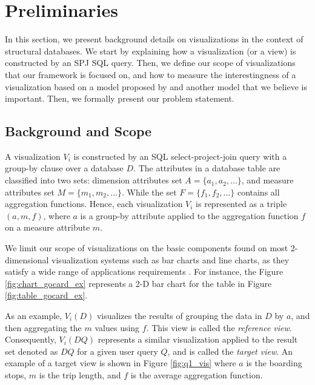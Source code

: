 \section{Preliminaries}
\label{sec:prelim}
%
%
In this section, we present background details on visualizations in the context of structural databases.
%
We start by explaining how a visualization (or a view) is constructed by an SPJ SQL query. 
%
Then, we define our scope of visualizations that our framework is focused on, and how to measure the interestingness of a visualization based on a model proposed by \cite{DBLP:journals/pvldb/VartakMPP14} and another model that we believe is important.
%
Then, we formally present our problem statement.
%

\subsection{Background and Scope}
%
A visualization $V_i$ is constructed by an SQL select-project-join query with a group-by clause over a database $D$.
% 
The attributes in a database table are classified into two sets: dimension attributes set $A=\{a_1, a_2, ...\}$, and measure attributes set $M=\{m_1, m_2, ... \}$. While the set $F=\{f_1, f_2, ... \}$ contains all aggregation functions.
%
Hence, each visualization $V_i$ is represented as a triple $(a, m, f)$, where $a$ is a group-by attribute applied to the aggregation function $f$ on a measure attribute $m$.
% 

%
We limit our scope of visualizations on the basic components found on most 2-dimensional visualization systems such as bar charts and line charts, as they satisfy a wide range of applications requirements \cite{Jugel:2016:VAV:2884416.2884424}. 
%
For instance, the Figure \ref{fig:chart_gocard_ex} represents a 2-D bar chart for the table in Figure \ref{fig:table_gocard_ex}.
%

As an example, $V_i(D)$ visualizes the results of grouping the data in $D$ by $a$, and then 
aggregating the $m$ values using $f$. 
%
This view is called the \emph{reference view}.
%
Consequently, $V_i(DQ)$ represents a similar visualization applied to the result set denoted as $DQ$ for a given user query $Q$, and is called the \emph{target view}.
%
An example of a target view is shown in Figure \ref{fig:q1_vis} where $a$ is the boarding stops, $m$ is the trip length, and $f$ is the average aggregation function.
%

